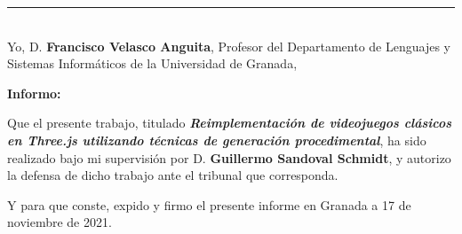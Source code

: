 \thispagestyle{empty}

\noindent\rule[-1ex]{\textwidth}{1pt}\\[4.5ex]

Yo, D. \textbf{Francisco Velasco Anguita}, Profesor del Departamento de Lenguajes y Sistemas Informáticos de la Universidad de Granada,

\vspace{0.5cm}

\textbf{Informo:}

\vspace{0.5cm}

Que el presente trabajo, titulado \textit{\textbf{Reimplementación de videojuegos clásicos en Three.js utilizando técnicas de generación procedimental}},
ha sido realizado bajo mi supervisión por D. \textbf{Guillermo Sandoval Schmidt}, y autorizo la defensa de dicho trabajo ante el tribunal
que corresponda.

\vspace{0.5cm}

Y para que conste, expido y firmo el presente informe en Granada a 17 de noviembre de 2021.